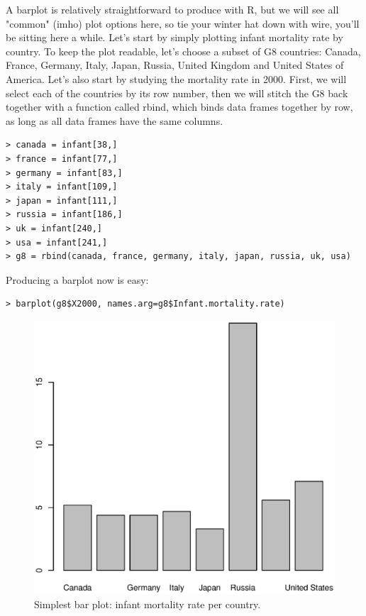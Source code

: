 \documentclass{report}
\newcommand{\code}[1]{\textsf{\ttfamily #1}}
\begin{document}
	A barplot is relatively straightforward to produce with R, but we will see all "common" (imho) plot options here, so tie your winter hat down with wire, you'll be sitting here a while.  Let's start by simply plotting infant mortality rate by country. To keep the plot readable, let's choose a subset of G8 countries: Canada, France, Germany, Italy, Japan, Russia, United Kingdom and United States of America. Let's also start by studying the mortality rate in 2000. First, we will select each of the countries by its row number, then we will stitch the G8 back together with a function called \code{rbind}, which binds data frames together by row, as long as all data frames have the same columns.
	\begin{verbatim}
> canada = infant[38,]
> france = infant[77,]
> germany = infant[83,]
> italy = infant[109,]
> japan = infant[111,]
> russia = infant[186,]
> uk = infant[240,]
> usa = infant[241,]
> g8 = rbind(canada, france, germany, italy, japan, russia, uk, usa)
	 \end{verbatim}

	Producing a barplot now is easy:
	\begin{verbatim}
> barplot(g8$X2000, names.arg=g8$Infant.mortality.rate)
	\end{verbatim}
	\begin{figure}[h]
		\centering
		\includegraphics[width=1.0\textwidth]{barsimple.eps}
		\caption{Simplest bar plot: infant mortality rate per country.}
	\label{fig:simplebar}
	\end{figure}
\end{document}
